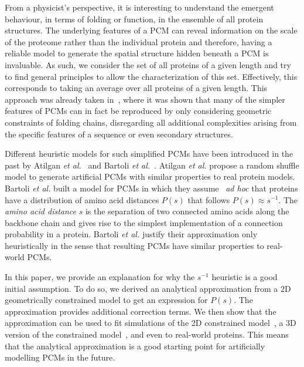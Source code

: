 \documentclass[10pt]{iopart}
\begin{document}
From a physicist's perspective, it is interesting to understand the emergent behaviour, in terms of folding or function, in the ensemble of all protein structures. The underlying features of a PCM can reveal information on the scale of the proteome rather than the individual protein and therefore, having a reliable model to generate the spatial structure hidden beneath a PCM is invaluable. As such, we consider the set of all proteins of a given length and try to find general principles to allow the characterization of this set. Effectively, this corresponds to taking an average over all proteins of a given length. This approach was already taken in~\cite{molkenthin2020self}, where it was shown that many of the simpler features of PCMs can in fact be reproduced by only considering geometric constraints of folding chains, disregarding all additional complexities arising from the specific features of a sequence or even secondary structures.

Different heuristic models for such simplified PCMs have been introduced in the past by Atilgan \textit{et al.}~\cite{atilgan2004smallworld} and Bartoli \textit{et al.}~\cite{bartoli2008effecta}. Atilgan \textit{et al.} propose a random shuffle model to generate artificial PCMs with similar properties to real protein models. Bartoli \textit{et al.} built a model for PCMs in which they assume ~\textit{ad hoc} that proteins have a distribution of amino acid distances $P(s)$ that follows $P(s) \approx s^{-1}$. The \textit{amino acid distance} $s$ is the separation of two connected amino acids along the backbone chain and gives rise to the simplest implementation of a connection probability in a protein. Bartoli \textit{et al.} justify their approximation only heuristically in the sense that resulting PCMs have similar properties to real-world PCMs. 

In this paper, we provide an explanation for why the $s^{-1}$ heuristic is a good initial assumption. To do so, we derived an analytical approximation from a 2D geometrically constrained model to get an expression for $P(s)$. The approximation provides additional correction terms. We then show that the approximation can be used to fit simulations of the 2D constrained model~\cite{molkenthin2016scaling}, a 3D version of the constrained model~\cite{molkenthin2020self}, and even to real-world proteins. This means that the analytical approximation is a good starting point for artificially modelling PCMs in the future. 

\end{document}
